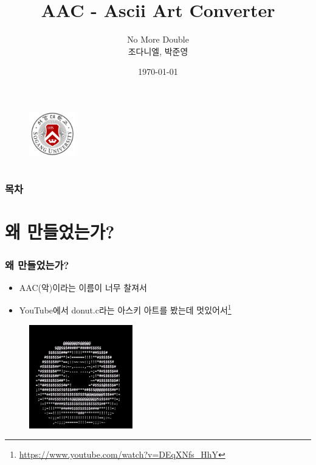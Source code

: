 \documentclass{beamer}
\title{AAC - Ascii Art Converter}
\author{No More Double \\ 조다니엘, 박준영}
\date{\today}
\institute{Sogang University \\ CSE2035/AIE2051}
\begin{document}
\section{}
\begin{frame}{}
	\titlepage
	\begin{figure}
		\vspace{-1em}
		\includegraphics[width=2cm]{sogang_university_logo}
		\vspace{1em}
	\end{figure}
\end{frame}

\section{}
\begin{frame}{}
	\frametitle{목차}
	\tableofcontents
\end{frame}

\section{왜 만들었는가?}
\begin{frame}{}
	\frametitle{왜 만들었는가?}
	\begin{itemize}
		\item AAC(악)이라는 이름이 너무 찰져서
		\item YouTube에서 donut.c라는 아스키 아트를 봤는데 멋있어서\footnote{\href{https://www.youtube.com/watch?v=DEqXNfs\_HhY}{\footnotesize{https://www.youtube.com/watch?v=DEqXNfs\_HhY}}}
	\end{itemize}
	\begin{figure}
		\centering
		\includegraphics[width=4.5cm, height=4.5cm]{donut.png}
	\end{figure}
\end{frame}
\end{document}

